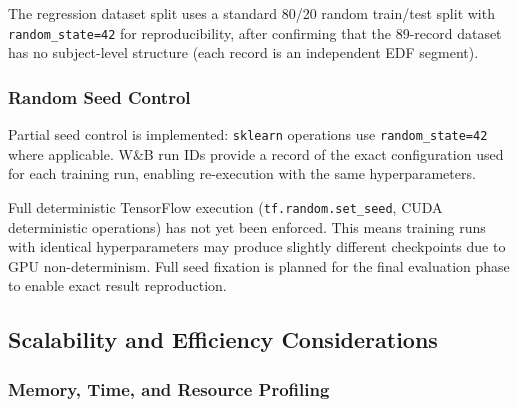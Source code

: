 \documentclass[10pt]{article}
\begin{document}
The regression dataset split uses a standard 80/20 random train/test split with \texttt{random\_state=42} for reproducibility, after confirming that the 89-record dataset has no subject-level structure (each record is an independent EDF segment).

\subsubsection{Random Seed Control}
\label{sec:randomSeedControl}

Partial seed control is implemented: \texttt{sklearn} operations use \texttt{random\_state=42} where applicable. W\&B run IDs provide a record of the exact configuration used for each training run, enabling re-execution with the same hyperparameters.

Full deterministic TensorFlow execution (\texttt{tf.random.set\_seed}, CUDA deterministic operations) has not yet been enforced. This means training runs with identical hyperparameters may produce slightly different checkpoints due to GPU non-determinism. Full seed fixation is planned for the final evaluation phase to enable exact result reproduction.

\subsection{Scalability and Efficiency Considerations}
\label{sec:scalability}

\subsubsection{Memory, Time, and Resource Profiling}
\label{sec:resourceProfiling}
\end{document}
